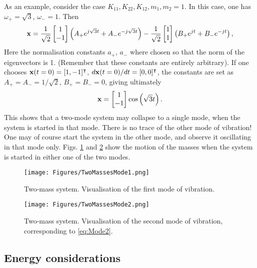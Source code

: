 \documentclass[11pt,twoside,a4paper,english]{book}
\begin{document}
As an example, consider the case $K_{11},K_{22},K_{12},m_1,m_2=1$. In this case, one has $\omega_+ = \sqrt{3}$, $\omega_- = 1$. Then
\begin{equation}\label{eq:TwoMassesDecomposed}
{\bf x} = \frac{1}{\sqrt{2}}\begin{bmatrix} 1 \\ -1\end{bmatrix}\left(A_+ e^{j\sqrt{3} t} + A_- e^{- j\sqrt{3} t} \right) - \frac{1}{\sqrt{2}}\begin{bmatrix} 1 \\ 1\end{bmatrix}\left(B_+ e^{j  t} + B_- e^{- j t} \right),
\end{equation}
Here the normalisation constants $a_+$, $a_-$ where chosen so that the norm of the eigenvectors is 1. (Remember that these constants are entirely arbitrary). 
If one chooses ${\bf x}(t=0)=[1,-1]^\intercal$, $d{\bf x}(t=0)/dt=[0,0]^\intercal$, the constants are set as $A_+=A_-=1/\sqrt{2}$, $B_+ = B_- = 0$, giving ultimately
\begin{equation}\label{eq:Mode2}
{\bf x} = \begin{bmatrix} 1 \\ -1\end{bmatrix}\cos\left(\sqrt{3}t\right).
\end{equation}
This shows that a two-mode system may collapse to a single mode, when the system is started in that mode. There is no trace of the other mode of vibration! One may of course start the system in the other mode, and observe it oscillating in that mode only. Figs. \ref{fig:TwoMassesMode1} and \ref{fig:TwoMassesMode2} show the motion of the masses when the system is started in either one of the two modes. 
\begin{figure}[hbt]
\centering
\texttt{[image: Figures/TwoMassesMode1.png]}
\caption{Two-mass system. Visualisation of the first mode of vibration.}\label{fig:TwoMassesMode1}
\end{figure}
\begin{figure}[hbt]
\centering
\texttt{[image: Figures/TwoMassesMode2.png]}
\caption{Two-mass system. Visualisation of the second mode of vibration, corresponding to \eqref{eq:Mode2}.}\label{fig:TwoMassesMode2}
\end{figure}



\subsection{Energy considerations}
\end{document}
